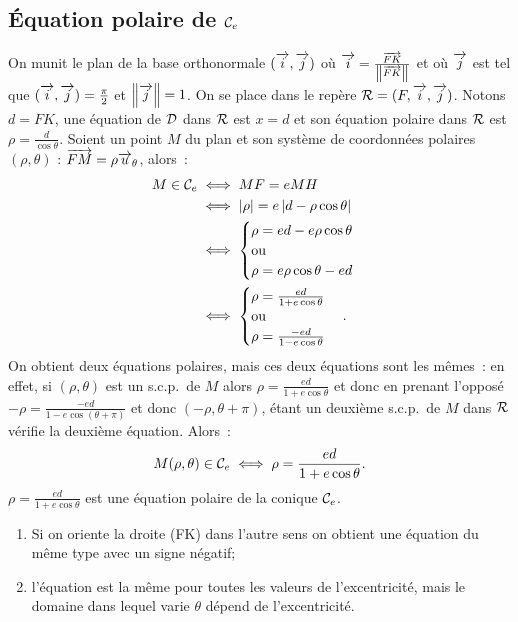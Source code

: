 \subsection{Équation polaire de \(\mathcal{C}_{e}\)}
On munit le plan de la base orthonormale \((\overrightarrow{i}, \overrightarrow{j})\) où 
\(\overrightarrow{i} = \frac{\overrightarrow{FK}}{\left\lVert\overrightarrow{FK}\right\rVert}\) et où \(\overrightarrow{j}\) est tel que 
\((\overrightarrow{i}, \overrightarrow{j}) = \frac{\pi}{2}\) et \(\left\lVert\overrightarrow{j}\right\rVert = 1\). On se place dans le repère 
\(\mathcal{R} = (F, \overrightarrow{i}, \overrightarrow{j})\). Notons \(d = FK\), une équation de \(\mathcal{D}\) dans \(\mathcal{R}\) est 
\(x = d\) et son équation polaire dans \(\mathcal{R}\) est \(\rho = \frac{d}{\cos 
\theta}\). Soient un point \(M\) du plan et son système de coordonnées polaires 
\((\rho, \theta)\) : \(\overrightarrow{FM} = \rho\overrightarrow{u}_\theta\), alors~:
\begin{align}
  M \in \mathcal{C}_{e} &\iff MF = e MH \\
                &\iff \left\lvert\rho\right\rvert = e\left\lvert d-\rho \cos\theta\right\rvert\\
                &\iff \begin{cases}\rho = ed-e\rho\cos\theta \\ \text{ou}\\ \rho 
                = e\rho\cos\theta-ed \end{cases} \\
                &\iff  \begin{cases}\rho = \frac{ed}{1 + e\cos\theta} \\ 
                \text{ou}\\ \rho = \frac{-ed}{1-e\cos\theta} \end{cases}.
\end{align}
On obtient deux équations polaires, mais ces deux équations sont les mêmes~: en 
effet, si \((\rho, \theta)\) est un s.c.p.\ de \(M\) alors 
\(\rho = \frac{ed}{1 + e\cos\theta}\) et donc en prenant l'opposé 
\(-\rho = \frac{-ed}{1-e\cos(\theta + \pi)}\) et donc \((-\rho, \theta + \pi)\), étant 
un deuxième s.c.p.\ de \(M\) dans \(\mathcal{R}\) vérifie la deuxième équation. Alors~:
\begin{equation}
  M(\rho, \theta) \in \mathcal{C}_{e} \iff \rho = \frac{ed}{1 + e\cos\theta}.
\end{equation}
\(\rho = \frac{ed}{1 + e\cos\theta}\) est une équation polaire de la conique 
\(\mathcal{C}_{e}\).
\begin{enumerate}
  \item Si on oriente la droite (FK) dans l'autre sens on obtient une équation 
    du même type avec un signe négatif;
  \item l'équation est la même pour toutes les valeurs de l'excentricité, mais 
    le domaine dans lequel varie \(\theta\) dépend de l'excentricité.
\end{enumerate}

